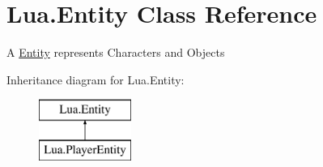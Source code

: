 \hypertarget{class_lua_1_1_entity}{}\section{Lua.\+Entity Class Reference}
\label{class_lua_1_1_entity}


A \mbox{\hyperlink{class_lua_1_1_entity}{Entity}} represents Characters and Objects  


Inheritance diagram for Lua.\+Entity\+:\begin{figure}[H]
\begin{center}
\leavevmode
\includegraphics[height=2.000000cm]{class_lua_1_1_entity}
\end{center}
\end{figure}
